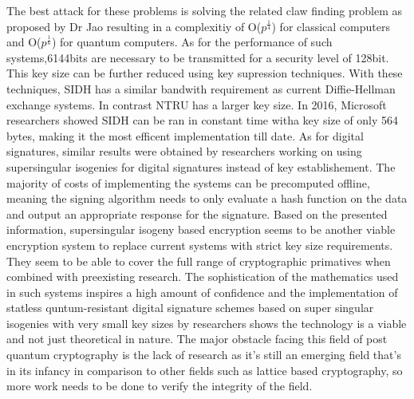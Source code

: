 \documentclass[10pt,a4paper]{article}
\begin{document}
The best attack for these problems is solving the related claw finding problem as proposed by Dr Jao%
resulting in a complexitiy of O(\(p^\frac{1}{4}\)) for classical computers and O(\(p^\frac{1}{6}\)) for quantum computers. 
\newline
\newline
As for the performance of such systems,6144bits are necessary to be transmitted for a security level of 128bit. This key size can be further reduced using key supression techniques. With these techniques, SIDH has a similar bandwith requirement as current Diffie-Hellman exchange systems. In contrast NTRU has a larger key size.
In 2016, Microsoft researchers showed SIDH can be ran in constant time witha key size of only 564 bytes, making it the most efficent implementation till date.
\newline
As for digital signatures, similar results were obtained by researchers working on using supersingular isogenies for digital signatures instead of key establishement. The majority of costs of implementing the systems can be precomputed offline, meaning the signing algorithm needs to only evaluate a hash function on the data and output an appropriate response for the signature.
\newline
\newline
Based on the presented information, supersingular isogeny based encryption seems to be another viable encryption system to replace current systems with strict key size requirements. They seem to be able to cover the full range of cryptographic primatives when combined with preexisting research. The sophistication of the mathematics used in such systems inspires a high amount of confidence and the implementation of statless quntum-resistant digital signature schemes based on super singular isogenies with very small key sizes by researchers shows the technology is a viable and not just theoretical in nature. The major obstacle facing this field of post quantum cryptography is the lack of research as it's still an emerging field that's in its infancy in comparison to other fields such as lattice based cryptography, so more work needs to be done to verify the integrity of the field.
\end{document}
